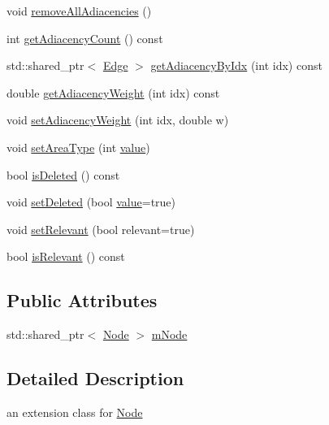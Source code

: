 \begin{DoxyCompactItemize}
void \mbox{\hyperlink{class_node_data_adb3003193e0baccc7baf25beb6dbbb98}{remove\+All\+Adiacencies}} ()
\item 
int \mbox{\hyperlink{class_node_data_af3dfaeb5d55486bc12673ae2bfdc77f3}{get\+Adiacency\+Count}} () const
\item 
std\+::shared\+\_\+ptr$<$ \mbox{\hyperlink{struct_node_data_1_1_edge}{Edge}} $>$ \mbox{\hyperlink{class_node_data_ae1dc0dbfdfd10a0e0c971cba66323e6d}{get\+Adiacency\+By\+Idx}} (int idx) const
\item 
double \mbox{\hyperlink{class_node_data_a41a9b0462f79e35150ae30a834c2d22f}{get\+Adiacency\+Weight}} (int idx) const
\item 
void \mbox{\hyperlink{class_node_data_a255e84f7e45de45c0e1eb36389f6eeb4}{set\+Adiacency\+Weight}} (int idx, double w)
\item 
void \mbox{\hyperlink{class_node_data_a688abf167edcf253ecb6438459bef7e7}{set\+Area\+Type}} (int \mbox{\hyperlink{diffusion_8cpp_a4b41795815d9f3d03abfc739e666d5da}{value}})
\item 
bool \mbox{\hyperlink{class_node_data_a1839982b09f3e47302aa9c36ab507cb7}{is\+Deleted}} () const
\item 
void \mbox{\hyperlink{class_node_data_a19a754aa6d35992e0ae81f98c837f6ea}{set\+Deleted}} (bool \mbox{\hyperlink{diffusion_8cpp_a4b41795815d9f3d03abfc739e666d5da}{value}}=true)
\item 
void \mbox{\hyperlink{class_node_data_abee818d778ab25cde47c3675d4376803}{set\+Relevant}} (bool relevant=true)
\item 
bool \mbox{\hyperlink{class_node_data_a43aa00e322ea393d87cd3887d2b6d018}{is\+Relevant}} () const
\end{DoxyCompactItemize}
\subsection*{Public Attributes}
\begin{DoxyCompactItemize}
\item 
std\+::shared\+\_\+ptr$<$ \mbox{\hyperlink{class_node}{Node}} $>$ \mbox{\hyperlink{class_node_data_ac51bb052329667bc790179278eb035d8}{m\+Node}}
\end{DoxyCompactItemize}


\subsection{Detailed Description}
an extension class for \mbox{\hyperlink{class_node}{Node}} 



